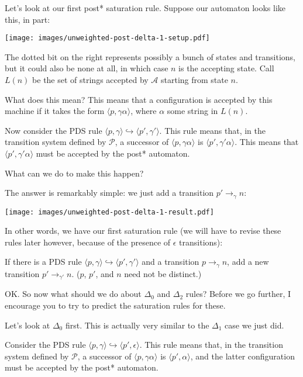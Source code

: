 \documentclass{article}
\newcommand{\Config}[2]{\ensuremath{\langle #1, #2 \rangle}}
\newcommand{\Rule}[2]{\ensuremath{#1 \hookrightarrow #2}}
\newcommand{\Trans}[3]{\ensuremath{#1 \rightarrow_{#2} #3}}
\begin{document}
Let's look at our first post* saturation rule. Suppose our automaton
looks like this, in part: \\
\begin{center}
  \texttt{[image: images/unweighted-post-delta-1-setup.pdf]}
\end{center}



The dotted bit on the right represents possibly a bunch of states and
transitions, but it could also be none at all, in which case $n$ is
the accepting state. Call $L(n)$ be the set of strings accepted by
$\mathcal{A}$ starting from state $n$.

What does this mean? This means that a configuration is accepted by
this machine if it takes the form \Config{p}{\gamma\alpha}, where
$\alpha$ some string in $L(n)$.

Now consider the PDS rule
\Rule{\Config{p}{\gamma}}{\Config{p'}{\gamma'}}. This rule means that,
in the transition system defined by $\mathcal{P}$, a successor of
\Config{p}{\gamma\alpha} is \Config{p'}{\gamma'\alpha}. This means
that \Config{p'}{\gamma'\alpha} must be accepted by the post*
automaton.

What can we do to make this happen?

The answer is remarkably simple: we just add a transition
$\Trans{p'}{\gamma}{n}$:\\
\begin{center}
  \texttt{[image: images/unweighted-post-delta-1-result.pdf]}
\end{center}

In other words, we have our first saturation rule (we will have to
revise these rules later however, because of the presence of
$\epsilon$ transitions):

   If there is a PDS rule
   \Rule{\Config{p}{\gamma}}{\Config{p'}{\gamma'}} and a transition
   \Trans{p}{\gamma}{n}, add a new transition
   \Trans{p'}{\gamma'}{n}. ($p$, $p'$, and $n$ need not be distinct.)

OK. So now what should we do about $\Delta_0$ and $\Delta_2$ rules?
Before we go further, I encourage you to try to predict the saturation
rules for these.

Let's look at $\Delta_0$ first. This is actually very similar to the
$\Delta_1$ case we just did.

Consider the PDS rule
\Rule{\Config{p}{\gamma}}{\Config{p'}{\epsilon}}. This rule means that,
in the transition system defined by $\mathcal{P}$, a successor of
\Config{p}{\gamma\alpha} is \Config{p'}{\alpha}, and the latter
configuration must be accepted by the post* automaton.
\end{document}
